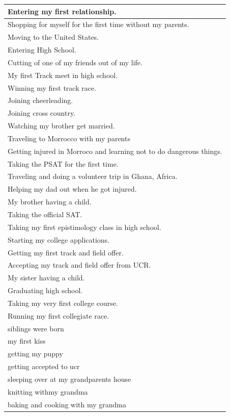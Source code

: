 \documentclass[
  .7em,
  letterpaper,
  DIV=11,
  numbers=noendperiod]{scrartcl}
\begin{document}
\begin{table}
\begin{tabular}{l}
\hline
Entering my first relationship.\\
\hline
Shopping for myself for the first time without my parents.\\
\hline
Moving to the United States.\\
\hline
Entering High School.\\
\hline
Cutting of one of my friends out of my life.\\
\hline
My first Track meet in high school.\\
\hline
Winning my first track race.\\
\hline
Joining cheerleading.\\
\hline
Joining cross country.\\
\hline
Watching my brother get married.\\
\hline
Traveling to Morrocco with my parents\\
\hline
Getting injured in Morroco and learning not to do dangerous things.\\
\hline
Taking the PSAT for the first time.\\
\hline
Traveling and doing a volunteer trip in Ghana, Africa.\\
\hline
Helping my dad out when he got injured.\\
\hline
My brother having a child.\\
\hline
Taking the official SAT.\\
\hline
Taking my first epistimology class in high school.\\
\hline
Starting my college applications.\\
\hline
Getting my first track and field offer.\\
\hline
Accepting my track and field offer from UCR.\\
\hline
My sister having a child.\\
\hline
Graduating high school.\\
\hline
Taking my very first college course.\\
\hline
Running my first collegiate race.\\
\hline
siblings were born\\
\hline
my first kiss\\
\hline
getting my puppy\\
\hline
getting accepted to ucr\\
\hline
sleeping over at my grandparents house\\
\hline
knitting withmy grandma\\
\hline
baking and cooking with my grandma\\

\end{tabular}
\end{table}
\end{document}
